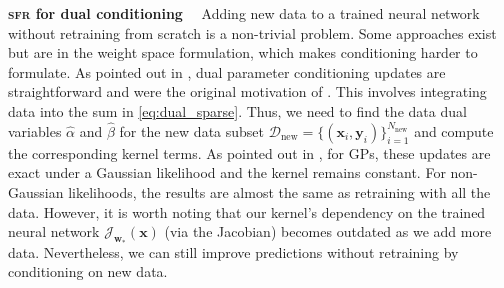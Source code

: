 \documentclass{article}
\renewcommand{\paragraph}[1]{{\bf #1}~~}
\newcommand{\our}{\textsc{sfr}\xspace}
\newcommand{\weights}{\ensuremath{\mathbf{w}}}
\newcommand{\mbf}[1]{\mathbf{#1}}
\newcommand{\MB}{\mbf{B}}
\newcommand{\MZ}{\mbf{Z}}
\newcommand{\T}{\top}
\newcommand{\vz}{\mbf{z}}
\newcommand{\vu}{\mbf{u}}
\newcommand{\vx}{\mbf{x}}
\newcommand{\vy}{\mbf{y}}
\newcommand{\vw}{\mbf{w}}
\newcommand{\Jac}[2]{\mathcal{J}_{#1}(#2)}
\DeclareMathOperator*{\argmin}{arg\,min}
\begin{document}
\paragraph{\our for dual conditioning} Adding new data to a trained neural network without retraining from scratch is a non-trivial problem. Some approaches exist \citep{kirsch2022marginal, spiegelhalter1990sequential} but are in the weight space formulation, which makes conditioning harder to formulate. As pointed out in \cite{chang2022fantasizing}, dual parameter conditioning updates are straightforward and were the original motivation of \cite{csato2002sparse}. This involves integrating data into the sum in \cref{eq:dual_sparse}. Thus, we need to find the data dual variables $\hat{\alpha}$ and $\hat{\beta}$ for the new data subset $\mathcal{D}_\textrm{new} = \{(\vx_i,\vy_i)\}_{i=1}^{N_{\textrm{new}}}$ and compute the corresponding kernel terms. As pointed out in \cite{chang2022fantasizing}, for GPs, these updates are exact under a Gaussian likelihood and the kernel remains constant. For non-Gaussian likelihoods, the results are almost the same as retraining with all the data. However, it is worth noting that our kernel's dependency on the trained neural network $\Jac{\weights_*}{\vx}$ (via the Jacobian) becomes outdated as we add more data. Nevertheless, we can still improve predictions without retraining by conditioning on new data.
\end{document}
